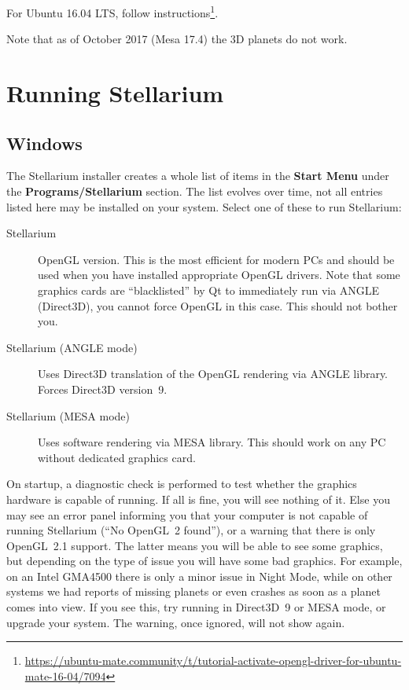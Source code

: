 For Ubuntu 16.04 LTS, follow instructions\footnote{\url{https://ubuntu-mate.community/t/tutorial-activate-opengl-driver-for-ubuntu-mate-16-04/7094}}. 
	
Note that as of October 2017 (Mesa 17.4) the 3D planets do not work.
	
	


\section{Running Stellarium}
\label{sec:GettingStarted:Running}

\subsection{Windows}
\label{sec:GettingStarted:Running:Windows}

The Stellarium installer creates a whole list of items in the
\textbf{Start Menu} under the \textbf{Programs/Stellarium}
section. The list evolves over time, not all entries listed here 
may be installed on your system. Select one of these to run Stellarium:
\begin{description}
\item[Stellarium] OpenGL version. This is the most efficient for
  modern PCs and should be used when you have installed appropriate
  OpenGL drivers. Note that some graphics cards are ``blacklisted'' by
  Qt to immediately run via ANGLE (Direct3D), you cannot force OpenGL in this
  case. This should not bother you.
\item[Stellarium (ANGLE mode)] Uses Direct3D translation of the OpenGL
  rendering via ANGLE library.  Forces Direct3D version~9.
\item[Stellarium (MESA mode)] Uses software rendering via MESA
  library. This should work on any PC without dedicated graphics card.
\end{description}
On startup, a diagnostic check is performed to test whether the
graphics hardware is capable of running. If all is fine, you will see
nothing of it.  Else you may see an error panel informing you that
your computer is not capable of running Stellarium (``No OpenGL~2
found''), or a warning that there is only OpenGL~2.1 support. The
latter means you will be able to see some graphics, but depending on
the type of issue you will have some bad graphics. For example, on an
Intel GMA4500 there is only a minor issue in Night Mode, while on
other systems we had reports of missing planets or even crashes as
soon as a planet comes into view. If you see this, try running in
Direct3D~9 or MESA mode, or upgrade your system. The warning, once
ignored, will not show again.


